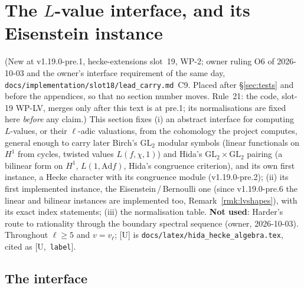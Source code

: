 \documentclass[11pt]{article}
\theoremstyle{remark}
\newcommand{\GL}{\mathrm{GL}}
\newcommand{\Ucite}[1]{[U,~\texttt{#1}]}               %
\begin{document}
\section{The \texorpdfstring{$L$}{L}-value interface, and its Eisenstein instance}\label{sec:lvalue}
(New at v1.19.0-pre.1, hecke-extensions slot~19, WP-2; owner ruling O6 of 2026-10-03 and the owner's interface requirement of the same day,
\texttt{docs/implementation/slot18/lead\_carry.md}~C9. Placed after \S\ref{sec:tests} and before the appendices, so that no section number moves. Rule~21:
the code, slot-19 WP-LV, merges only after this text is at pre.1; its normalisations are fixed here \emph{before} any claim.) This section fixes (i) an abstract
interface for computing $L$-values, or their $\ell$-adic valuations, from the cohomology the project computes, general enough to carry later Birch's
$\GL_2$ modular symbols (linear functionals on $H^{1}$ from cycles, twisted values $L(f,\chi,1)$) and Hida's $\GL_2\times\GL_2$ pairing (a bilinear form on $H^{1}$,
$L(1,\mathrm{Ad}f)$, Hida's congruence criterion), and its own first instance, a Hecke character with its congruence module (v1.19.0-pre.2); (ii) its first implemented instance, the Eisenstein\,/\,Bernoulli one (since v1.19.0-pre.6 the \textsf{linear} and \textsf{bilinear} instances are implemented too, Remark~\ref{rmk:lvshapes}), with its exact index
statements; (iii) the normalisation table. \textbf{Not used}: Harder's route to rationality through the boundary spectral sequence (owner, 2026-10-03). Throughout
$\ell\ge5$ and $v=v_\ell$; [U] is \texttt{docs/latex/hida\_hecke\_algebra.tex}, cited as \Ucite{label}.

\subsection{The interface}\label{sec:lviface}
\end{document}
